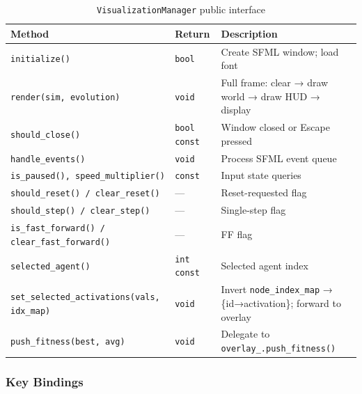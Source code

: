 \begin{table}[H]
\centering\small
\caption{\texttt{VisualizationManager} public interface}
\begin{tabularx}{\textwidth}{@{}llX@{}}
\toprule
\textbf{Method} & \textbf{Return} & \textbf{Description} \\
\midrule
\texttt{initialize()} & \texttt{bool} & Create SFML window; load font \\
\texttt{render(sim, evolution)} & \texttt{void} & Full frame: clear → draw world → draw HUD → display \\
\texttt{should\_close()} & \texttt{bool const} & Window closed or Escape pressed \\
\texttt{handle\_events()} & \texttt{void} & Process SFML event queue \\
\texttt{is\_paused(), speed\_multiplier()} & \texttt{const} & Input state queries \\
\texttt{should\_reset() / clear\_reset()} & — & Reset-requested flag \\
\texttt{should\_step() / clear\_step()} & — & Single-step flag \\
\texttt{is\_fast\_forward() / clear\_fast\_forward()} & — & FF flag \\
\texttt{selected\_agent()} & \texttt{int const} & Selected agent index \\
\texttt{set\_selected\_activations(vals, idx\_map)} & \texttt{void} & Invert \texttt{node\_index\_map} → \{id→activation\}; forward to overlay \\
\texttt{push\_fitness(best, avg)} & \texttt{void} & Delegate to \texttt{overlay\_.push\_fitness()} \\
\bottomrule
\end{tabularx}
\end{table}

\subsubsection{Key Bindings}

